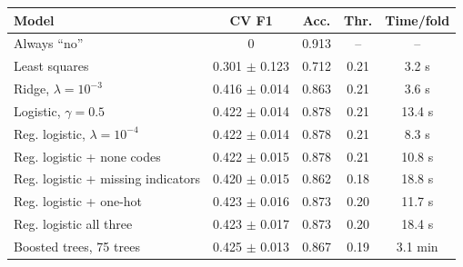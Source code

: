 \begin{tabular}{lcccc}
\hline
Model & CV F1 & Acc. & Thr. & Time/fold \\
\hline
Always ``no'' & 0 & 0.913 & -- & -- \\
Least squares & 0.301 $\pm$ 0.123 & 0.712 & 0.21 & 3.2 s \\
Ridge, $\lambda=10^{-3}$ & 0.416 $\pm$ 0.014 & 0.863 & 0.21 & 3.6 s \\
Logistic, $\gamma=0.5$ & 0.422 $\pm$ 0.014 & 0.878 & 0.21 & 13.4 s \\
Reg. logistic, $\lambda=10^{-4}$ & 0.422 $\pm$ 0.014 & 0.878 & 0.21 & 8.3 s \\
\hline
\quad Reg. logistic + none codes & 0.422 $\pm$ 0.015 & 0.878 & 0.21 & 10.8 s \\
\quad Reg. logistic + missing indicators & 0.420 $\pm$ 0.015 & 0.862 & 0.18 & 18.8 s \\
\quad Reg. logistic + one-hot & 0.423 $\pm$ 0.016 & 0.873 & 0.20 & 11.7 s \\
\quad Reg. logistic all three & 0.423 $\pm$ 0.017 & 0.873 & 0.20 & 18.4 s \\
\hline
Boosted trees, 75 trees & 0.425 $\pm$ 0.013 & 0.867 & 0.19 & 3.1 min \\
\hline
\end{tabular}
